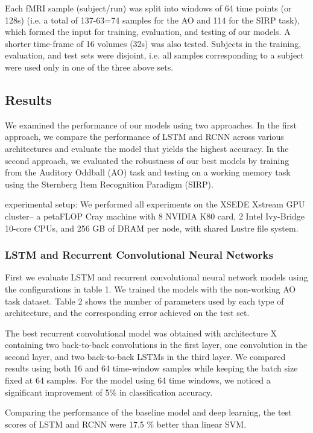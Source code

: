 \documentclass{article} %
\begin{document}
Each fMRI sample (subject/run) was split into windows of 64 time points (or 128s) (i.e. a total of 137-63=74 samples for the AO and 114 for the SIRP task), which formed the input for training, evaluation, and testing of our models. A shorter time-frame of 16 volumes (32s) was also tested. Subjects in the training, evaluation, and test sets were disjoint, i.e. all samples corresponding to a subject were used only in one of the three above sets.  

\subsection*{Results}

We examined the performance of our models using two approaches. In the first approach, we compare the performance of LSTM and RCNN across various architectures and evaluate the model that yields the highest accuracy. In the second approach, we evaluated the robustness of our best models by training from the Auditory Oddball (AO) task and testing on a working memory task using the Sternberg Item Recognition Paradigm (SIRP). 

experimental setup: We performed all experiments on the XSEDE Xstream GPU cluster-- a petaFLOP Cray machine with 8 NVIDIA K80 card, 2 Intel Ivy-Bridge 10-core CPUs, and 256 GB of DRAM per node, with shared Lustre file system. 


\subsubsection*{LSTM and Recurrent Convolutional Neural Networks}

First we evaluate LSTM and recurrent convolutional neural network models using the configurations in table 1. We trained the models with the non-working AO task dataset. Table 2 shows the number of parameters used by each type of architecture, and the corresponding error achieved on the test set. 

The best recurrent convolutional model was obtained with architecture X containing two back-to-back convolutions in the first layer, one convolution in the second layer, and two back-to-back LSTMs in the third layer. We compared results using both 16 and 64 time-window samples while keeping the batch size fixed at 64 samples. For the model using 64 time windows, we noticed a significant improvement of 5\% in classification accuracy. 

Comparing the performance of the baseline model and deep learning, the test scores of LSTM and RCNN were 17.5 \% better than linear SVM.  
\end{document}
